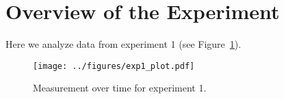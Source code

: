 \section{Overview of the Experiment}

Here we analyze data from experiment 1 (see Figure~\ref{fig:exp1}).

\begin{figure}[ht]
  \centering
  \texttt{[image: ../figures/exp1\_plot.pdf]}
  \caption{Measurement over time for experiment 1.}
  \label{fig:exp1}
\end{figure}